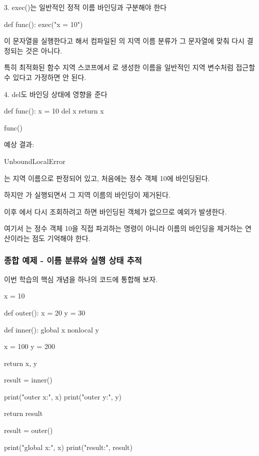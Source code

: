 \begin{dhknote}
\begin{dhksmry}[centered]
3. exec()는 일반적인 정적 이름 바인딩과 구분해야 한다
\end{dhksmry}
\end{dhknote}

\begin{dhkcode}
def func():
    exec("x = 10")
\end{dhkcode}

이 문자열을 실행한다고 해서 컴파일된 의 지역 이름 분류가 그 문자열에 맞춰 다시 결정되는 것은 아니다.

특히 최적화된 함수 지역 스코프에서 로 생성한 이름을 일반적인 지역 변수처럼 접근할 수 있다고 가정하면 안 된다.

\begin{dhknote}
\begin{dhksmry}[centered]
4. del도 바인딩 상태에 영향을 준다
\end{dhksmry}
\end{dhknote}

\begin{dhkcode}
def func():
    x = 10
    del x
    return x


func()
\end{dhkcode}

예상 결과:

\begin{dhkzsh}
UnboundLocalError
\end{dhkzsh}

는 지역 이름으로 판정되어 있고, 처음에는 정수 객체 10에 바인딩된다.

하지만 가 실행되면서 그 지역 이름의 바인딩이 제거된다.

이후 에서 다시 조회하려고 하면 바인딩된 객체가 없으므로 예외가 발생한다.

여기서 는 정수 객체 10을 직접 파괴하는 명령이 아니라 이름의 바인딩을 제거하는 연산이라는 점도 기억해야 한다.

\subsubsection{종합 예제 - 이름 분류와 실행 상태 추적}

이번 학습의 핵심 개념을 하나의 코드에 통합해 보자.

\begin{dhkcode}
x = 10


def outer():
    x = 20
    y = 30

    def inner():
        global x
        nonlocal y

        x = 100
        y = 200

        return x, y

    result = inner()

    print("outer x:", x)
    print("outer y:", y)

    return result


result = outer()

print("global x:", x)
print("result:", result)
\end{dhkcode}

